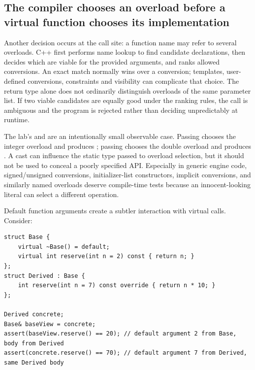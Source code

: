 \subsection{The compiler chooses an overload before a virtual function chooses its implementation}\label{01-foundations-i-ch004-the-compiler-chooses-an-overload-before-a-virtual-function-chooses-its-implementation}

\hypertarget{01-foundations-i-ch004-the-compiler-chooses-an-overload-before-a-virtual-function-chooses-its-implementation}{}

Another decision occurs at the call site: a function name may refer to several overloads. C++ first performs name lookup to find candidate declarations, then decides which are viable for the provided arguments, and ranks allowed conversions. An exact match normally wins over a conversion; templates, user-defined conversions, constraints and visibility can complicate that choice. The return type alone does not ordinarily distinguish overloads of the same parameter list. If two viable candidates are equally good under the ranking rules, the call is ambiguous and the program is rejected rather than deciding unpredictably at runtime.

The lab's  and  are an intentionally small observable case. Passing  chooses the integer overload and produces ; passing  chooses the double overload and produces . A cast can influence the static type passed to overload selection, but it should not be used to conceal a poorly specified API. Especially in generic engine code, signed/unsigned conversions, initializer-list constructors, implicit conversions, and similarly named overloads deserve compile-time tests because an innocent-looking literal can select a different operation.

Default function arguments create a subtler interaction with virtual calls. Consider:

\begin{verbatim}
struct Base {
    virtual ~Base() = default;
    virtual int reserve(int n = 2) const { return n; }
};
struct Derived : Base {
    int reserve(int n = 7) const override { return n * 10; }
};

Derived concrete;
Base& baseView = concrete;
assert(baseView.reserve() == 20); // default argument 2 from Base, body from Derived
assert(concrete.reserve() == 70); // default argument 7 from Derived, same Derived body
\end{verbatim}


